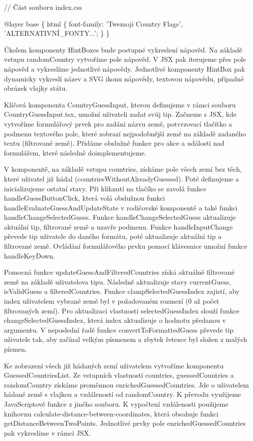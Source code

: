 \begin{prog}
// Část souboru index.css

@layer base \{
  html \{
    font-family: 'Twemoji Country Flags', 'ALTERNATIVNÍ_FONTY...';
  \}
\}
\end{prog}

Úkolem komponenty HintBoxes bude postupné vykreslení nápověd. Na základě vstupu randomCountry vytvoříme pole nápověd. V JSX pak iterujeme přes pole nápověd a vykreslíme jednotlivé nápovědy. 
Jednotlivé komponenty HintBox pak dynamicky vykreslí název a SVG ikonu nápovědy, textovou nápovědu, případně obrázek vlajky státu.

Klíčová komponenta CountryGuessInput, kterou definujeme v rámci souboru CountryGuessInput.tsx, umožní uživateli zadat svůj tip. 
Začneme s JSX, kde vytvoříme formulářový prvek pro zadání názvu země, potvrzovací tlačítko a podmenu textového pole, které zobrazí nejpodobnější země na základě zadaného textu (filtrované země). 
Přidáme obslužné funkce pro akce a události nad formulářem, které následně doimplementujeme.

V komponentě, na základě vstupu countries, získáme pole všech zemí bez těch, které uživatel již hádal (countriesWithoutAlreadyGuessed). Poté definujeme a inicializujeme ostatní stavy. 
Při kliknutí na tlačíko se zavolá funkce handleGuessButtonClick, která volá obslužnou funkci handleEvaluateGuessAndUpdateState v rodičovské komponentě a také funkci handleChangeSelectedGuess. 
Funkce handleChangeSelectedGuess aktualizuje aktuální tip, filtrované země a uzavře podmenu. Funkce handleInputChange převede tip uživatele do daného formátu, poté aktualizuje aktuální tip a filtrované země. 
Ovládání formulářového prvku pomocí klávesnice umožní funkce handleKeyDown.

Pomocná funkce updateGuessAndFilteredCountries získá aktuálně filtrované země na základě uživatelova tipu. Následně aktualizuje stavy currentGuess, isValidGuess a filteredCountries. 
Funkce clampSelectedGuessIndex zajistí, aby index uživatelem vybrané země byl v požadovaném rozmezí (0 až počet filtrovaných zemí). 
Pro aktualizaci vlastnosti selectedGuessIndex slouží funkce changeSelectedGuessIndex, která index aktualizuje o hodnotu předanou v argumentu.
V neposlední řadě funkce convertToFormattedGuess převede tip uživatele tak, aby začínal velkým písmenem a zbytek řetezce byl složen z malých písmen.

Ke zobrazení všech již hádaných zemí uživatelem vytvoříme komponentu GuessedCountriesList. Ze vstupních vlastností countries, guessedCountries a randomCountry získáme proměnnou enrichedGuessedCountries. 
Jde o uživatelem hádané země s vlajkou a vzdáleností od randomCountry. K převodu využijeme JavaScriptové funkce z jiného souboru. 
K vypočtení vzdálenosti použijeme knihovnu calculate-distance-between-coordinates, která obsahuje funkci getDistanceBetweenTwoPoints. Jednotlivé prvky pole enrichedGuessedCountries pak vykreslíme v rámci JSX.

